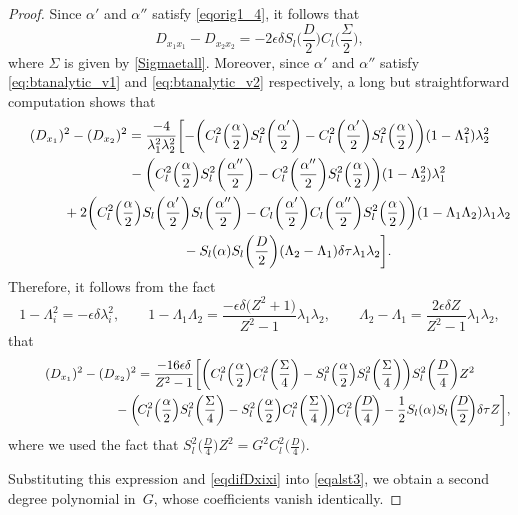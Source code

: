 \documentclass[pdftex]{sigma}
\numberwithin{equation}{section}
\begin{document}
\begin{proof}
Since $\alpha'$ and $\alpha''$ satisfy \eqref{eqorig1_4}, it follows that
\begin{equation}\label{eqdifDxixi}
D_{x_1x_1}-D_{x_2x_2}=-2\epsilon\delta S_l\biggl(\frac{D}{2}\biggr) C_l\biggl(\frac{\Sigma}{2}\biggr),
\end{equation}
where $\Sigma$ is given by \eqref{Sigmaetall}. Moreover, since $\alpha'$ and $\alpha''$ satisfy
\eqref{eq:btanalytic_v1} and \eqref{eq:btanalytic_v2} respectively,
 a long but straightforward computation shows that
\begin{gather*}
(D_{x_1})^2-(D_{x_2})^2=\frac{-4}{\lambda_1^2\lambda_2^2}
\biggl[ -\biggl( C_l^2\Bigl(\frac{\alpha}{2}\Bigr)S_l^2\biggl(\frac{\alpha'}{2}\biggr)-
C_l^2\biggl(\frac{\alpha'}{2}\biggr)S_l^2\Bigl(\frac{\alpha}{2}\Bigr)\biggr) (1-\Lambda_1^2)\lambda_2^2 \\
\qquad\qquad{}-\biggl( C_l^2\Bigl(\frac{\alpha}{2}\Bigr)S_l^2\biggl(\frac{\alpha''}{2}\biggr)-
C_l^2\biggl(\frac{\alpha''}{2}\biggr)S_l^2\Bigl(\frac{\alpha}{2}\Bigr)\biggr) (1-\Lambda_2^2)\lambda_1^2 \\
\qquad\qquad{}+2\biggl( C_l^2\Bigl(\frac{\alpha}{2}\Bigr)S_l\biggl(\frac{\alpha'}{2}\biggr)S_l\biggl(\frac{\alpha''}{2}\biggr) - C_l\biggl(\frac{\alpha'}{2}\biggr)C_l\biggl(\frac{\alpha''}{2}\biggr)S_l^2\Bigl(\frac{\alpha}{2}\Bigr) \biggr)(1-\Lambda_1\Lambda_2)\lambda_1\lambda_2 \\
\qquad\qquad{} -S_l(\alpha)S_l\biggl(\frac{D}{2}\biggr) (\Lambda_2-\Lambda_1)\delta\tau\lambda_1\lambda_2 \biggr].
\end{gather*}
Therefore, it follows from the fact
\[
1-\Lambda_i^2=-\epsilon\delta\lambda_i^2, \qquad
1-\Lambda_1\Lambda_2=\frac{-\epsilon\delta\bigl(Z^2+1\bigr)}{Z^2-1} \lambda_1\lambda_2, \qquad
\Lambda_2-\Lambda_1=\frac{2\epsilon\delta Z}{Z^2-1}\lambda_1\lambda_2,
\]
 that
\begin{gather*}
(D_{x_1})^2-(D_{x_2})^2=\frac{-16\epsilon\delta}{Z^2-1}\biggl[ \biggl( C_l^2\Bigl(\frac{\alpha}{2} \Bigr) C_l^2\biggl(\frac{\Sigma}{4}\biggr)- S_l^2\Bigl(\frac{\alpha}{2}\Bigr) S_l^2\biggl(\frac{\Sigma}{4}\biggr) \biggr)
S_l^2\biggl(\frac{D}{4}\biggr)Z^2 \\
\hphantom{(D_{x_1})^2-(D_{x_2})^2=}{}
-\biggl(\! C_l^2\Bigl(\frac{\alpha}{2}\Bigr)S_l^2\biggl(\frac{\Sigma}{4}\biggr)-
S_l^2\Bigl(\frac{\alpha}{2} \Bigr) C_l^2\biggl(\frac{\Sigma}{4}\biggr)\!\biggr)
C_l^2\biggl(\!\frac{D}{4}\!\biggr)
 -\frac{1}{2}S_l(\alpha)S_l\biggl(\!\frac{D}{2}\!\biggr)\delta\tau Z
 \biggr],
\end{gather*}
where we used the fact that $S_l^2\bigl(\frac{D}{4}\bigr)Z^2=G^2 C_l^2\bigl(\frac{D}{4}\bigr)$.

Substituting this expression and \eqref{eqdifDxixi} into \eqref{eqalst3}, we obtain
a second degree polynomial in~$G$, whose coefficients vanish identically.
\end{proof}
\end{document}
